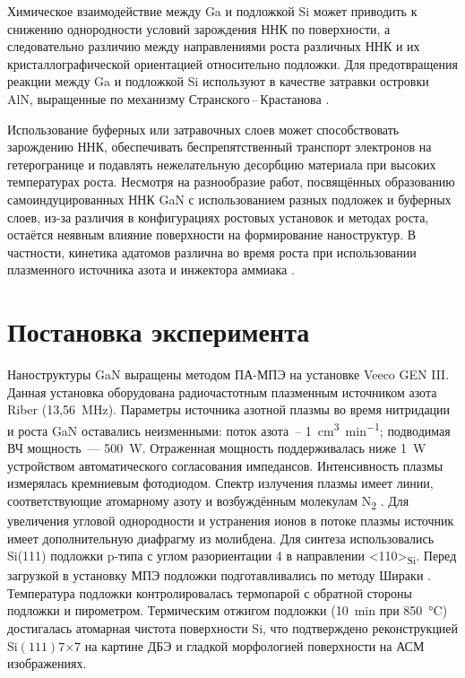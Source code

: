Химическое взаимодействие между Ga и подложкой Si может приводить к снижению
однородности условий зарождения ННК по поверхности, а следовательно различию
между направлениями роста различных ННК и их кристаллографической ориентацией
относительно подложки. Для предотвращения реакции между Ga и подложкой Si
используют в качестве затравки островки AlN, выращенные по механизму
Странского\,--\,Крастанова \cite{Songmuang2007}.

Использование буферных или затравочных слоев может способствовать зарождению
ННК, обеспечивать беспрепятственный транспорт электронов на гетерогранице и
подавлять нежелательную десорбцию материала при высоких температурах роста.
Несмотря на разнообразие работ, посвящённых образованию самоиндуцированных ННК
GaN с использованием разных подложек и буферных слоев, из-за различия в
конфигурациях ростовых установок и методах роста, остаётся неявным влияние
поверхности на формирование наноструктур. В частности, кинетика адатомов
различна во время роста при использовании плазменного источника азота и
инжектора аммиака \cite{Kawaharazuka2010}.

\section{Постановка эксперимента}\label{sec:ch3/sec1}

Наноструктуры GaN выращены методом ПА-МПЭ на установке Veeco GEN III. Данная
установка оборудована радиочастотным плазменным источником азота Riber
(13,56~\si{\mega\hertz}). Параметры источника азотной плазмы во время
нитридации и роста GaN оставались неизменными: поток азота~--
1~\si{\centi\meter^3\per\minute}; подводимая ВЧ мощность~--- 500~\si{\watt}.
Отраженная мощность поддерживалась ниже 1~\si{\watt} устройством
автоматического согласования импедансов. Интенсивность плазмы измерялась
кремниевым фотодиодом. Спектр излучения плазмы имеет линии, соответствующие
атомарному азоту и возбуждённым молекулам N\textsubscript{2}
\cite{Debnath2016}. Для увеличения угловой однородности и устранения ионов в
потоке плазмы источник имеет дополнительную диафрагму из молибдена. Для синтеза
использовались Si(111) подложки p-типа с углом разориентации 4{\textdegree} в
направлении <110>\textsubscript{Si}. Перед загрузкой в установку МПЭ подложки
подготавливались по методу Шираки \cite{Ishizaka2019}. Температура подложки
контролировалась термопарой с обратной стороны подложки и пирометром.
Термическим отжигом подложки (10~\si{\minute} при 850~\si{\degreeCelsius})
достигалась атомарная чистота поверхности Si, что подтверждено реконструкцией
Si\((111)7\)\(\times\)\(7\) на картине ДБЭ и гладкой морфологией поверхности на
АСМ изображениях.

